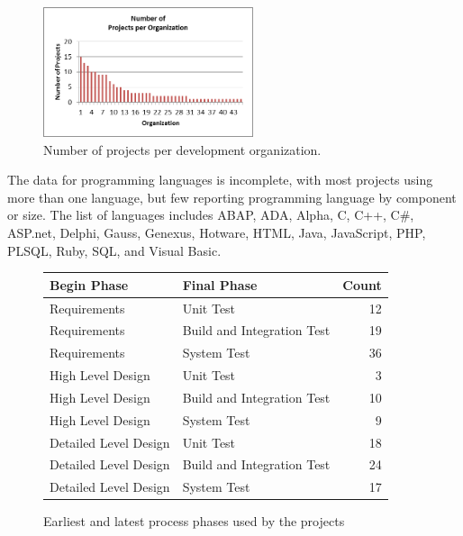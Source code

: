 \documentclass[smallcondensed]{svjour3}
\begin{document}
 
\begin{figure}[!t] 
\begin{center}
\includegraphics[height=1.5in]{img/number_of_projects_per_org.png}
\end{center} 
\caption{Number of projects per development organization.}
\label{fig:number of projects per organization}
\end{figure}

  
The data for programming languages is incomplete, with most projects using more than one language, but few reporting  programming language by component or size.  The list of languages includes ABAP, ADA, Alpha, C, C++, C\#, ASP.net, Delphi, Gauss, Genexus, Hotware, HTML, Java, JavaScript, PHP, PLSQL, Ruby, SQL, and Visual Basic. 
 
 
 
 \begin{figure}[ht]
\scriptsize
\centering
\begin{tabular}{llr} 
 Begin Phase &  Final Phase & Count  \\\hline
  Requirements      & Unit Test                   & 12  \\ 
  Requirements      & Build and Integration Test  & 19  \\ 
  Requirements      & System Test                 & 36  \\ 
  High Level Design & Unit Test                   & 3  \\ 
  High Level Design & Build and Integration Test  & 10  \\ 
  High Level Design & System Test                 & 9  \\ 
  Detailed Level Design & Unit Test                   & 18  \\ 
  Detailed Level Design & Build and Integration Test  & 24  \\ 
  Detailed Level Design & System Test                 & 17  \\ 
\end{tabular}
\caption{Earliest and latest process phases used by the projects}
\label{fig:earliest-and-least-process-phases}
\end{figure}
 
\end{document}
